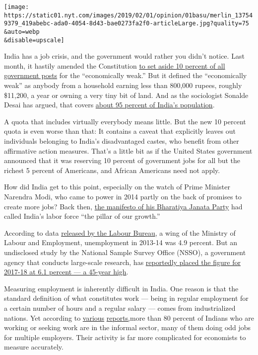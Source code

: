 \texttt{[image: https://static01.nyt.com/images/2019/02/01/opinion/01basu/merlin\_137549379\_419abebc-ada0-4054-8d43-bae0273fa2f0-articleLarge.jpg?quality=75\\\&auto=webp\\\&disable=upscale]}

India has a job crisis, and the government would rather you didn't
notice. Last month, it hastily amended the Constitution
\href{https://www.thehindubusinessline.com/news/national/the-124th-amendment-a-look-at-the-facts/article25990756.ece}{to
set aside 10 percent of all government posts} for the ``economically
weak.'' But it defined the ``economically weak'' as anybody from a
household earning less than 800,000 rupees, roughly \$11,200, a year or
owning a very tiny bit of land. And as the sociologist Sonalde Desai has
argued, that covers
\href{https://www.thehindu.com/opinion/lead/a-solution-in-search-of-a-problem/article25962037.ece}{about
95 percent of India's population}.

A quota that includes virtually everybody means little. But the new 10
percent quota is even worse than that: It contains a caveat that
explicitly leaves out individuals belonging to India's disadvantaged
castes, who benefit from other affirmative action measures. That's a
little bit as if the United States government announced that it was
reserving 10 percent of government jobs for all but the richest 5
percent of Americans, and African Americans need not apply.

How did India get to this point, especially on the watch of Prime
Minister Narendra Modi, who came to power in 2014 partly on the back of
promises to create more jobs? Back then,
\href{https://www.bjp.org/images/pdf_2014/full_manifesto_english_07.04.2014.pdf}{the
manifesto of his Bharatiya Janata Party} had called India's labor force
``the pillar of our growth.''

According to data
\href{https://economictimes.indiatimes.com/news/economy/indicators/unemployment-rate-up-at-4-9-in-2013-14-labour-bureau/articleshow/45796927.cms}{released
by the Labour Bureau}, a wing of the Ministry of Labour and Employment,
unemployment in 2013-14 was 4.9 percent. But an undisclosed study by the
National Sample Survey Office (NSSO), a government agency that conducts
large-scale research, has
\href{https://www.business-standard.com/article/economy-policy/unemployment-rate-at-five-decade-high-of-6-1-in-2017-18-nsso-survey-119013100053_1.html}{reportedly
placed the figure for 2017-18 at 6.1 percent --- a 45-year high}.

Measuring employment is inherently difficult in India. One reason is
that the standard definition of what constitutes work --- being in
regular employment for a certain number of hours and a regular salary
--- comes from industrialized nations. Yet according to
\href{http://www.ihdindia.org/sarnet/books/IEG_2016_ES.pdf}{various}
\href{https://www.ilo.org/global/publications/books/WCMS_626831/lang--en/index.htm}{reports,}more
than 80 percent of Indians who are working or seeking work are in the
informal sector, many of them doing odd jobs for multiple employers.
Their activity is far more complicated for economists to measure
accurately.

